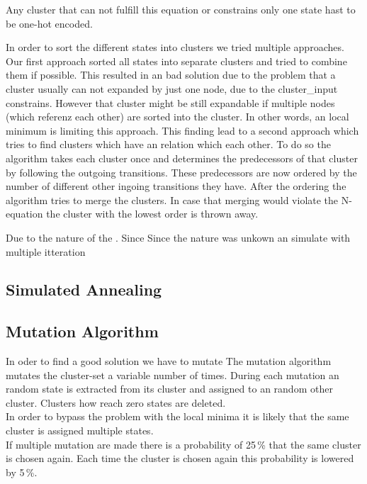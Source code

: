 Any cluster that can not fulfill this equation or constrains only one state hast to be one-hot encoded. 

In order to sort the different states into clusters we tried multiple approaches. Our first approach sorted all states into separate clusters and tried to combine them if possible. This resulted in an bad solution due to the problem that a cluster usually can not expanded by just one node, due to the cluster\_input constrains. However that cluster might be still expandable if multiple nodes (which referenz each other) are sorted into the cluster. In other words, an local minimum is limiting this approach.
This finding lead to a second approach which tries to find clusters which have an relation which each other. To do so the algorithm takes each cluster once and determines the predecessors of that cluster by following the outgoing transitions.
These predecessors are now ordered by the number of different other ingoing transitions they have. After the ordering the algorithm tries to merge the clusters. In case that merging would violate the N-equation the cluster with the lowest order is thrown away. 

Due to the nature of the . Since 
Since the nature was unkown an simulate with multiple itteration

\subsection{Simulated Annealing}
\label{subsubsec:format_clusters}


\subsection{Mutation Algorithm}
\label{subsubsec:format_clusters}

In oder to find a good solution we have to mutate
The mutation algorithm mutates the cluster-set a variable number of times.
During each mutation an random state is extracted from its cluster and assigned to an random other cluster. Clusters how reach zero states are deleted. \\
In order to bypass the problem with the local minima it is likely that the same cluster is assigned multiple states.\\
If multiple mutation are made there is a probability of 25\,\% that the same cluster is chosen again. Each time the cluster is chosen again this probability is lowered by 5\,\%.






